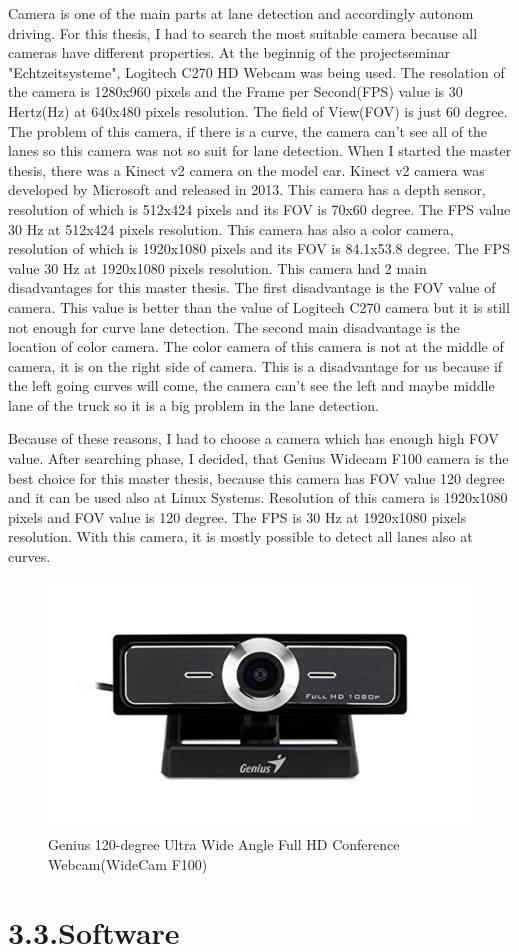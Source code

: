 Camera is one of the main parts at lane detection and accordingly autonom driving. For this thesis, I had to search
the most suitable camera because all cameras have different properties. At the beginnig of the projectseminar 
"Echtzeitsysteme", Logitech C270 HD Webcam was being used. The resolation of the camera is 1280x960 pixels and the 
Frame per Second(FPS) value is 30 Hertz(Hz) at 640x480 pixels resolution. The field of View(FOV) is just 60 degree. The 
problem of this camera, if there is a curve, the camera can't see all of the lanes so this camera was not so suit for 
lane detection. When I started the master thesis, there was a Kinect v2 camera on the model car. Kinect v2 camera was 
developed by Microsoft and released in 2013. This camera has a depth sensor, resolution of which is 512x424 pixels and 
its FOV is 70x60 degree. The FPS value 30 Hz at 512x424 pixels resolution. This camera has also a color camera, 
resolution of which is 1920x1080 pixels and its FOV is 84.1x53.8 degree. The FPS value 30 Hz at 1920x1080 pixels 
resolution. This camera had 2 main disadvantages for this master thesis. The first disadvantage is the FOV value of 
camera. This value is better than the value of Logitech C270 camera but it is still not enough for curve lane detection.
The second main disadvantage is the location of color camera. The color camera of this camera is not at the middle of 
camera, it is on the right side of camera. This is a disadvantage for us because if the left going curves will come, the
camera can't see the left and maybe middle lane of the truck so it is a big problem in the lane detection.

Because of these reasons, I had to choose a camera which has enough high FOV value. After searching phase, I decided, 
that Genius Widecam F100 camera is the best choice for this master thesis, because this camera has FOV value 120 degree
and it can be used also at Linux Systems. Resolution of this camera is 1920x1080 pixels and FOV value is 120 degree.
The FPS is 30 Hz at 1920x1080 pixels resolution. With this camera, it is mostly possible to detect all lanes also at
curves. 

\begin{figure}
	\centering
	\hspace*{0cm}   
	\includegraphics[width=150mm,scale=1]{./Bilder/Genius_F100_camera.png}
	\caption{Genius 120-degree Ultra Wide Angle Full HD Conference Webcam(WideCam F100) }
\end{figure}


%
\section*{3.3.Software}\label{sec:Software}
%


